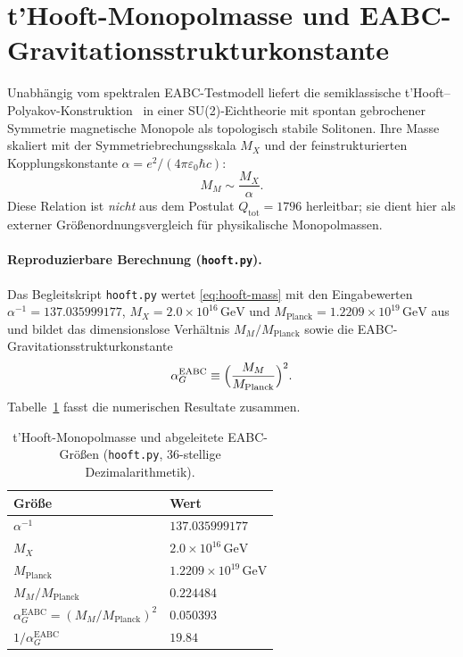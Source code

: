 \documentclass[11pt,a4paper]{article}
\newcommand{\hooftAlphaInv}{137.035999177}
\newcommand{\hooftMX}{2.0\times 10^{16}\,\mathrm{GeV}}
\newcommand{\hooftMPlanck}{1.2209\times 10^{19}\,\mathrm{GeV}}
\newcommand{\hooftMMPlanck}{0.224484}
\newcommand{\hooftAlphaG}{0.050393}
\newcommand{\hooftInvAlphaG}{19.84}
\begin{document}
\section{t'Hooft-Monopolmasse und EABC-Gravitationsstrukturkonstante}
\label{sec:hooft-monopolmasse}

Unabhängig vom spektralen EABC-Testmodell liefert die semiklassische
t'Hooft--Polyakov-Konstruktion~\cite{thooft,polyakov} in einer
SU(2)-Eichtheorie mit spontan gebrochener Symmetrie magnetische Monopole
als topologisch stabile Solitonen. Ihre Masse skaliert mit der
Symmetriebrechungsskala $M_X$ und der feinstrukturierten Kopplungskonstante
$\alpha = e^2/(4\pi\varepsilon_0\hbar c)$:
\begin{equation}
  M_M \sim \frac{M_X}{\alpha}.
  \label{eq:hooft-mass}
\end{equation}
Diese Relation ist \emph{nicht} aus dem Postulat $Q_{\mathrm{tot}}=1796$
herleitbar; sie dient hier als externer Größenordnungsvergleich für
physikalische Monopolmassen.

\paragraph{Reproduzierbare Berechnung (\texttt{hooft.py}).}
Das Begleitskript \texttt{hooft.py} wertet \eqref{eq:hooft-mass} mit den
Eingabewerten $\alpha^{-1}=\hooftAlphaInv$, $M_X=\hooftMX$ und
$M_{\mathrm{Planck}}=\hooftMPlanck$ aus und bildet das dimensionslose Verhältnis
$M_M/M_{\mathrm{Planck}}$ sowie die EABC-Gravitationsstrukturkonstante
\begin{equation}
  \alpha_G^{\mathrm{EABC}} \equiv \Bigl(\frac{M_M}{M_{\mathrm{Planck}}}\Bigr)^2.
  \label{eq:alpha-g-eabc}
\end{equation}
Tabelle~\ref{tab:hooft-ergebnisse} fasst die numerischen Resultate zusammen.

\begin{table}[htbp]
\centering
\caption{t'Hooft-Monopolmasse und abgeleitete EABC-Größen
(\texttt{hooft.py}, $36$-stellige Dezimalarithmetik).}
\label{tab:hooft-ergebnisse}
\begin{tabular}{ll}
\toprule
\textbf{Größe} & \textbf{Wert} \\
\midrule
$\alpha^{-1}$ & $\hooftAlphaInv$ \\
$M_X$ & $\hooftMX$ \\
$M_{\mathrm{Planck}}$ & $\hooftMPlanck$ \\
$M_M/M_{\mathrm{Planck}}$ & $\hooftMMPlanck$ \\
$\alpha_G^{\mathrm{EABC}} = (M_M/M_{\mathrm{Planck}})^2$ & $\hooftAlphaG$ \\
$1/\alpha_G^{\mathrm{EABC}}$ & $\hooftInvAlphaG$ \\
\bottomrule
\end{tabular}
\end{table}
\end{document}
